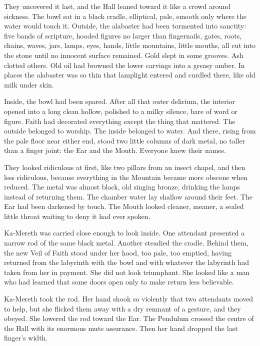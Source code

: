 They uncovered it last, and the Hall leaned toward it like a crowd around sickness. 
The bowl sat in a black cradle, elliptical, pale, smooth only where the water would touch it. 
Outside, the alabaster had been tormented into sanctity: five bands of scripture, hooded figures no larger than fingernails, 
gates, roots, chains, waves, jars, lamps, eyes, hands, little mountains, little mouths, all cut into the stone until no innocent surface remained. 
Gold slept in some grooves. 
Ash clotted others. 
Old oil had browned the lower carvings into a greasy amber. 
In places the alabaster was so thin that lamplight entered and curdled there, like old milk under skin.\par

Inside, the bowl had been spared. 
After all that outer delirium, the interior opened into a long clean hollow, polished to a milky silence, bare of word or figure. 
Faith had decorated everything except the thing that mattered. 
The outside belonged to worship. 
The inside belonged to water. 
And there, rising from the pale floor near either end, stood two little columns of dark metal, no taller than a finger joint: the Ear and the Mouth. 
Everyone knew their names. \par

They looked ridiculous at first, like two pillars from an insect chapel, and then less ridiculous, because everything in the Mountain became more obscene when reduced. 
The metal was almost black, old singing bronze, drinking the lamps instead of returning them. The chamber water lay shallow around their feet. 
The Ear had been darkened by touch. The Mouth looked cleaner, meaner, a sealed little throat waiting to deny it had ever spoken.\par

Ka-Mereth was carried close enough to look inside. 
One attendant presented a narrow rod of the same black metal. 
Another steadied the cradle. 
Behind them, the new Veil of Faith stood under her hood, too pale, too emptied, having returned from the labyrinth with the bowl and with whatever the 
labyrinth had taken from her in payment. 
She did not look triumphant. 
She looked like a man who had learned that some doors open only to make return less believable.\par

Ka-Mereth took the rod. 
Her hand shook so violently that two attendants moved to help, but she flicked them away with a dry remnant of a gesture, and they obeyed. 
She lowered the rod toward the Ear. 
The Pendulum crossed the centre of the Hall with its enormous mute assurance. 
Then her hand dropped the last finger’s width.\par

